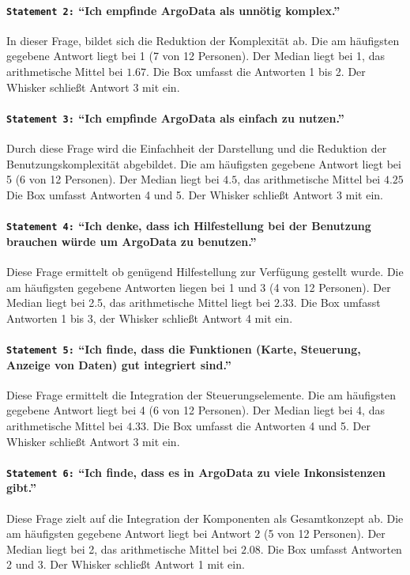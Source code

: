  \paragraph{\texttt{Statement 2:} "`Ich empfinde ArgoData als unnötig komplex."'}
    In dieser Frage, bildet sich die Reduktion der Komplexität ab.
    Die am häufigsten gegebene Antwort liegt bei 1 (7 von 12 Personen).  Der Median liegt bei 1, das arithmetische Mittel bei $1.67$. Die Box umfasst die Antworten 1 bis 2. Der Whisker schließt Antwort 3 mit ein.

  \paragraph{\texttt{Statement 3:} "`Ich empfinde ArgoData als einfach zu nutzen."'}
    Durch diese Frage wird die Einfachheit der Darstellung und die Reduktion der Benutzungskomplexität abgebildet. Die am häufigsten gegebene Antwort liegt bei 5 (6 von 12 Personen). Der Median liegt bei $4.5$, das arithmetische Mittel bei $4.25$   Die Box umfasst Antworten 4 und 5. Der Whisker schließt Antwort 3 mit ein.

\paragraph{\texttt{Statement 4:} "`Ich denke, dass ich Hilfestellung bei der Benutzung brauchen würde um ArgoData zu benutzen."'}
    Diese Frage ermittelt ob genügend Hilfestellung zur Verfügung gestellt wurde.  Die am häufigsten gegebene Antworten liegen bei 1 und 3 (4 von 12 Personen).  Der Median liegt bei 2.5, das arithmetische Mittel liegt bei $2.33$. Die Box umfasst Antworten 1 bis 3, der Whisker schließt Antwort 4 mit ein.

\paragraph{\texttt{Statement 5:} "`Ich finde, dass die Funktionen (Karte, Steuerung, Anzeige von Daten) gut integriert sind."'}
    Diese Frage ermittelt die Integration der Steuerungselemente. 
    Die am häufigsten gegebene Antwort liegt bei 4 (6 von 12 Personen). Der Median liegt bei 4, das arithmetische Mittel bei $4.33$. Die Box umfasst  die Antworten 4 und 5. Der Whisker schließt Antwort 3 mit ein.

\paragraph{\texttt{Statement 6:} "`Ich finde, dass es in ArgoData zu viele Inkonsistenzen gibt."'}
    Diese Frage zielt auf die Integration der Komponenten als Gesamtkonzept ab. Die am häufigsten gegebene Antwort liegt bei Antwort 2 (5 von 12 Personen). Der Median liegt bei 2, das arithmetische Mittel bei $2.08$. Die Box umfasst Antworten 2 und 3. Der Whisker schließt Antwort 1 mit ein.

